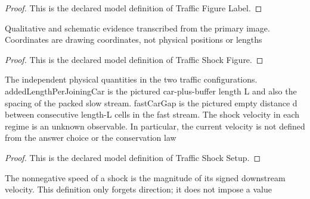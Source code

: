 \begin{proof}
  This is the declared model definition of Traffic Figure Label.
\end{proof}
\begin{definition}
  \label{def:physics:phyx-mini-0729:phyxminiproblems-problemphyxmini0729-trafficshockfigure}
  Qualitative and schematic evidence transcribed from the primary image. Coordinates are drawing coordinates, not physical positions or lengths
\end{definition}
\begin{proof}
  This is the declared model definition of Traffic Shock Figure.
\end{proof}
\begin{definition}
  \label{def:physics:phyx-mini-0729:phyxminiproblems-problemphyxmini0729-trafficshocksetup}
  The independent physical quantities in the two traffic configurations. addedLengthPerJoiningCar is the pictured car-plus-buffer length L and also the spacing of the packed slow stream. fastCarGap is the pictured empty distance d between consecutive length-L cells in the fast stream. The shock velocity in each regime is an unknown observable. In particular, the current velocity is not defined from the answer choice or the conservation law
\end{definition}
\begin{proof}
  This is the declared model definition of Traffic Shock Setup.
\end{proof}
\begin{definition}
  \label{def:physics:phyx-mini-0729:phyxminiproblems-problemphyxmini0729-shockspeedinmeterspersecond}
  The nonnegative speed of a shock is the magnitude of its signed downstream velocity. This definition only forgets direction; it does not impose a value
\end{definition}

